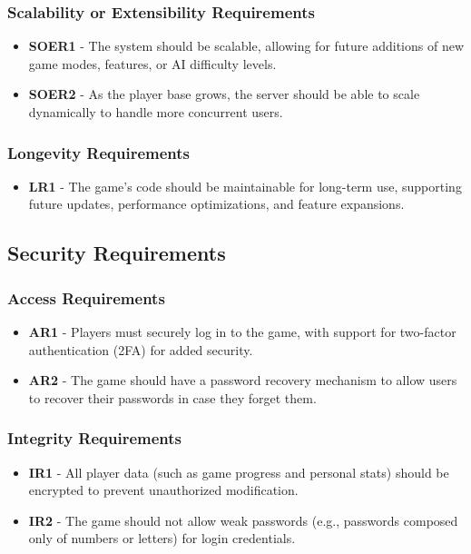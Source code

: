 \documentclass[12pt, titlepage]{article}
\begin{document}
\subsubsection{Scalability or Extensibility Requirements}
\begin{itemize}
    \item \textbf{SOER1} - The system should be scalable, allowing for future additions of new game modes, features, or AI difficulty levels.
    \item \textbf{SOER2} - As the player base grows, the server should be able to scale dynamically to handle more concurrent users.
\end{itemize}

\subsubsection{Longevity Requirements}
\begin{itemize}
    \item \textbf{LR1} - The game’s code should be maintainable for long-term use, supporting future updates, performance optimizations, and feature expansions.
\end{itemize}

\subsection{Security Requirements}

\subsubsection{Access Requirements}
\begin{itemize}
    \item \textbf{AR1} - Players must securely log in to the game, with support for two-factor authentication (2FA) for added security.
    \item \textbf{AR2} - The game should have a password recovery mechanism to allow users to recover their passwords in case they forget them.
\end{itemize}

\subsubsection{Integrity Requirements}
\begin{itemize}
    \item \textbf{IR1} - All player data (such as game progress and personal stats) should be encrypted to prevent unauthorized modification.
    \item \textbf{IR2} - The game should not allow weak passwords (e.g., passwords composed only of numbers or letters) for login credentials.
\end{itemize}
\end{document}
